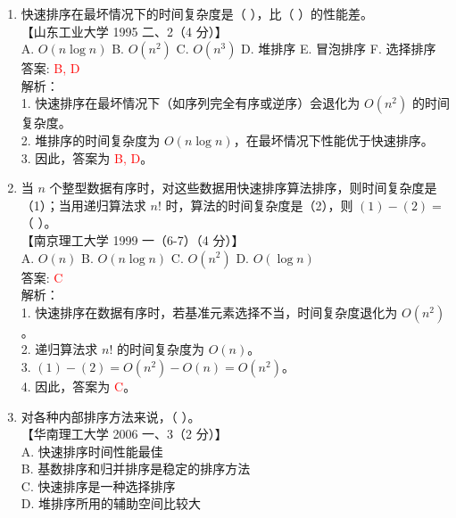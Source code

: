 \documentclass[lang=cn,newtx,10pt,scheme=chinese]{../../../elegantbook}
\begin{document}
\begin{enumerate}
\item 快速排序在最坏情况下的时间复杂度是（ ），比（ ）的性能差。\\
    【山东工业大学 1995 二、2（4 分）】\\  

    A. $O(n \log n)$ \quad B. $O(n^2)$ \quad C. $O(n^3)$ \quad D. 堆排序 \quad E. 冒泡排序 \quad F. 选择排序 \\  

    答案: \textcolor{red}{B, D} \\

    解析：\\
    1. 快速排序在最坏情况下（如序列完全有序或逆序）会退化为 $O(n^2)$ 的时间复杂度。\\
    2. 堆排序的时间复杂度为 $O(n \log n)$，在最坏情况下性能优于快速排序。\\
    3. 因此，答案为 \textcolor{red}{B, D}。\\

\item 当 $n$ 个整型数据有序时，对这些数据用快速排序算法排序，则时间复杂度是（1）；当用递归算法求 $n!$ 时，算法的时间复杂度是（2），则 $(1) - (2) = $（ ）。\\
    【南京理工大学 1999 一（6-7）（4 分）】\\  

    A. $O(n)$ \quad B. $O(n \log n)$ \quad C. $O(n^2)$ \quad D. $O(\log n)$ \\  

    答案: \textcolor{red}{C} \\

    解析：\\
    1. 快速排序在数据有序时，若基准元素选择不当，时间复杂度退化为 $O(n^2)$。\\
    2. 递归算法求 $n!$ 的时间复杂度为 $O(n)$。\\
    3. $(1) - (2) = O(n^2) - O(n) = O(n^2)$。\\
    4. 因此，答案为 \textcolor{red}{C}。\\

\item 对各种内部排序方法来说，（ ）。\\
    【华南理工大学 2006 一、3（2 分）】\\  

    A. 快速排序时间性能最佳 \\  
    B. 基数排序和归并排序是稳定的排序方法 \\  
    C. 快速排序是一种选择排序 \\  
    D. 堆排序所用的辅助空间比较大 \\  


\end{enumerate}
\end{document}

